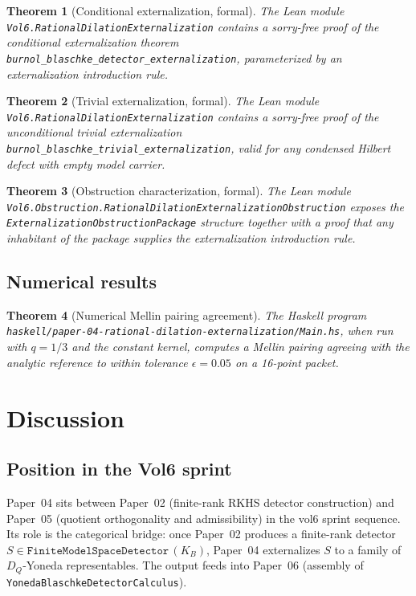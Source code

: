 \documentclass[12pt]{article}
\theoremstyle{plain}
\newtheorem{theorem}{Theorem}[section]
\theoremstyle{definition}
\theoremstyle{remark}
\newcommand{\KB}{K_{B}}
\newcommand{\DQ}{D_{Q}}
\begin{document}
\begin{theorem}[Conditional externalization, formal]
\label{thm:cond-ext-formal}
The Lean module
\texttt{Vol6.RationalDilationExternalization} contains a sorry-free
proof of the conditional externalization theorem
\texttt{burnol\_blaschke\_detector\_externalization}, parameterized by
an externalization introduction rule.
\end{theorem}

\begin{theorem}[Trivial externalization, formal]
\label{thm:triv-ext-formal}
The Lean module
\texttt{Vol6.RationalDilationExternalization} contains a sorry-free
proof of the unconditional trivial externalization
\texttt{burnol\_blaschke\_trivial\_externalization}, valid for any
condensed Hilbert defect with empty model carrier.
\end{theorem}

\begin{theorem}[Obstruction characterization, formal]
\label{thm:obs-formal}
The Lean module
\texttt{Vol6.Obstruction.RationalDilationExternalizationObstruction}
exposes the
\texttt{ExternalizationObstructionPackage} structure together with a
proof that any inhabitant of the package supplies the externalization
introduction rule.
\end{theorem}

\subsection{Numerical results}

\begin{theorem}[Numerical Mellin pairing agreement]
\label{thm:numerical}
The Haskell program
\texttt{haskell/paper-04-rational-dilation-externalization/Main.hs}, when run
with $q=1/3$ and the constant kernel, computes a Mellin pairing
agreeing with the analytic reference to within tolerance
$\epsilon = 0.05$ on a 16-point packet.
\end{theorem}

\section{Discussion}
\label{sec:discussion}

\subsection{Position in the Vol6 sprint}

Paper~04 sits between Paper~02 (finite-rank RKHS detector
construction) and Paper~05 (quotient orthogonality and admissibility)
in the vol6 sprint sequence.  Its role is the categorical bridge: once
Paper~02 produces a finite-rank detector
$S\in\texttt{FiniteModelSpaceDetector}\,(\KB)$, Paper~04 externalizes
$S$ to a family of $\DQ$-Yoneda representables.  The output feeds into
Paper~06 (assembly of \texttt{YonedaBlaschkeDetectorCalculus}).
\end{document}
